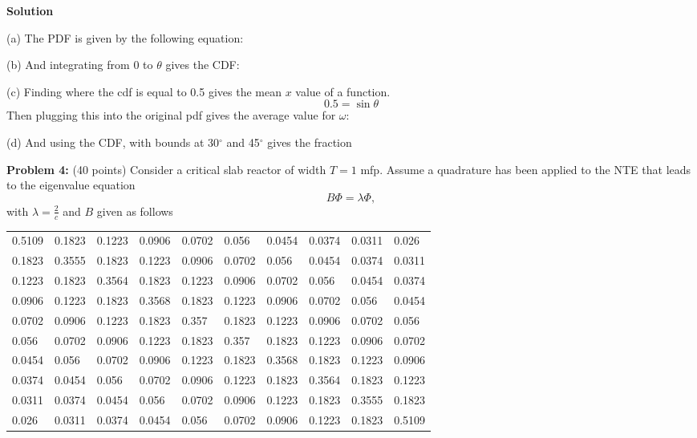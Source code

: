 \documentclass{amsart}
\theoremstyle{definition}
\begin{document}
\textbf{Solution}

(a) The PDF is given by the following equation: \\

(b) And integrating from 0 to $\theta$ gives the CDF: \\

(c) Finding where the cdf is equal to 0.5 gives the mean $x$ value of a function. \\
$$ 0.5 = \sin{\theta} $$
Then plugging this into the original pdf gives the average value for $\omega$: 

(d) And using the CDF, with bounds at 30$^\circ$ and 45$^\circ$ gives the fraction 


\newpage
\textbf{Problem 4:} (40 points) Consider a critical slab reactor of width $T=1$ mfp. Assume a quadrature has been applied to the NTE that leads to the eigenvalue equation
\begin{equation*}
    B\Phi = \lambda \Phi,
\end{equation*}
with $\lambda = \frac{2}{c}$ and $B$ given as follows \newline
\begin{table}[h!]
\begin{tabular}{llllllllll}
0.5109 & 0.1823 & 0.1223 & 0.0906 & 0.0702 & 0.056  & 0.0454 & 0.0374 & 0.0311 & 0.026  \\
0.1823 & 0.3555 & 0.1823 & 0.1223 & 0.0906 & 0.0702 & 0.056  & 0.0454 & 0.0374 & 0.0311 \\
0.1223 & 0.1823 & 0.3564 & 0.1823 & 0.1223 & 0.0906 & 0.0702 & 0.056  & 0.0454 & 0.0374 \\
0.0906 & 0.1223 & 0.1823 & 0.3568 & 0.1823 & 0.1223 & 0.0906 & 0.0702 & 0.056  & 0.0454 \\
0.0702 & 0.0906 & 0.1223 & 0.1823 & 0.357  & 0.1823 & 0.1223 & 0.0906 & 0.0702 & 0.056  \\
0.056  & 0.0702 & 0.0906 & 0.1223 & 0.1823 & 0.357  & 0.1823 & 0.1223 & 0.0906 & 0.0702 \\
0.0454 & 0.056  & 0.0702 & 0.0906 & 0.1223 & 0.1823 & 0.3568 & 0.1823 & 0.1223 & 0.0906 \\
0.0374 & 0.0454 & 0.056  & 0.0702 & 0.0906 & 0.1223 & 0.1823 & 0.3564 & 0.1823 & 0.1223 \\
0.0311 & 0.0374 & 0.0454 & 0.056  & 0.0702 & 0.0906 & 0.1223 & 0.1823 & 0.3555 & 0.1823 \\
0.026  & 0.0311 & 0.0374 & 0.0454 & 0.056  & 0.0702 & 0.0906 & 0.1223 & 0.1823 & 0.5109
\end{tabular}
\end{table}
 
\end{document}

